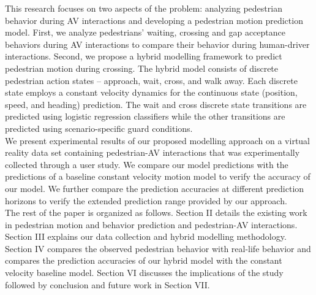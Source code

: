 \documentclass[letter,journal]{IEEEtran}
\begin{document}






This research focuses on two aspects of the problem: analyzing pedestrian behavior during AV interactions and developing a pedestrian motion prediction model. First, we analyze pedestrians' waiting, crossing and gap acceptance behaviors during AV interactions to compare their behavior during human-driver interactions. Second, we propose a hybrid modelling framework to predict pedestrian motion during crossing. The hybrid model consists of discrete pedestrian action states -- approach, wait, cross, and walk away. Each discrete state employs a constant velocity dynamics for the continuous state (position, speed, and heading) prediction. The wait and cross discrete state transitions are predicted using logistic regression classifiers while the other transitions are predicted using scenario-specific guard conditions. \\

We present experimental results of our proposed modelling approach on a virtual reality data set containing pedestrian-AV interactions that was experimentally collected through a user study. We compare our model predictions with the predictions of a baseline constant velocity motion model to verify the accuracy of our model. We further compare the prediction accuracies at different prediction horizons to verify the extended prediction range provided by our approach.\\

The rest of the paper is organized as follows. Section II details the existing work in pedestrian motion and behavior prediction and pedestrian-AV interactions. Section III explains our data collection and hybrid modelling methodology. Section IV compares the observed pedestrian behavior with real-life behavior and compares the prediction accuracies of our hybrid model with the constant velocity baseline model. Section VI discusses the implications of the study followed by conclusion and future work in Section VII.




\end{document}
